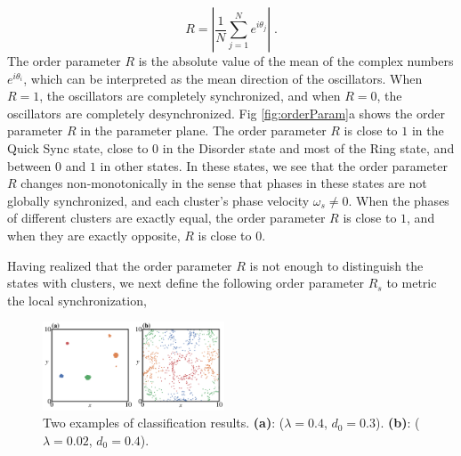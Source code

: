\documentclass[%
 aip,
 amsmath,amssymb,
 reprint,%
]{revtex4-1}
\begin{document}
\begin{equation}
    R=\left| \frac{1}{N}\sum_{j=1}^N{e^{i\theta _j}} \right|\;.
\end{equation}
The order parameter $R$ is the absolute value of the mean of the complex numbers $e^{i\theta _i}$, which can be interpreted as the mean direction of the oscillators. When $R=1$, the oscillators are completely synchronized, and when $R=0$, the oscillators are completely desynchronized. Fig \ref{fig:orderParam}a shows the order parameter $R$ in the parameter plane. The order parameter $R$ is close to $1$ in the Quick Sync state, close to $0$ in the Disorder state and most of the Ring state, and between $0$ and $1$ in other states. In these states, we see that the order parameter $R$ changes non-monotonically in the sense that phases in these states are not globally synchronized, and each cluster's phase velocity $\omega_s\ne 0$. When the phases of different clusters are exactly equal, the order parameter $R$ is close to $1$, and when they are exactly opposite, $R$ is close to $0$.

Having realized that the order parameter $R$ is not enough to distinguish the states with clusters, we next define the following order parameter $R_s$ to metric the local synchronization,

\begin{figure}[b]
    \includegraphics[width=0.48\textwidth]{./figs/classifyResult.pdf}
    \caption{
        \label{fig:classifyResult} Two examples of classification results. \textbf{(a)}: ($\lambda=0.4$, $d_0=0.3$). \textbf{(b)}: ($\lambda=0.02$, $d_0=0.4$).
    }
\end{figure}
\end{document}
